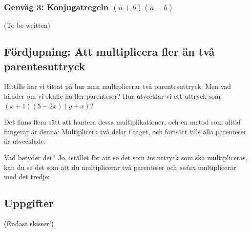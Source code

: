 \subsubsection{Genväg 3: Konjugatregeln $(a+b)(a-b)$}

(To be written)

\subsection{Fördjupning: Att multiplicera fler än två parentesuttryck}

Hittills har vi tittat på hur man multiplicerar två parentesuttryck.
Men vad händer om vi skulle ha fler parenteser?
Hur utvecklar vi ett uttryck som $(x+1)(5-2x)(y+x)$?

Det finns flera sätt att hantera dessa multiplikationer, och en metod som alltid fungerar är denna:
Multiplicera två delar i taget, och fortsätt tills alla parenteser är utvecklade.

Vad betyder det?
Jo, istället för att se det som \emph{tre} uttryck som ska multipliceras, kan du se det som att du multiplicerar två parenteser och \emph{sedan} multiplicerar med det tredje:

\smallskip
{}
\smallskip

\subsection{Uppgifter}

(Endast skisser!)

